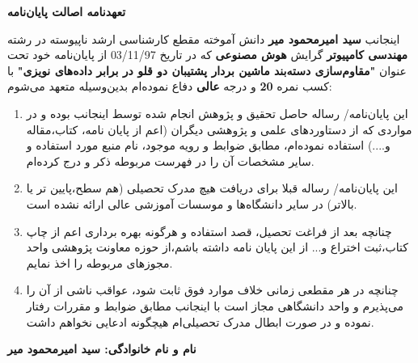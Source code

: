 \thispagestyle{empty}
\noindent

\textbf{\Large تعهدنامه اصالت  پایان‌نامه}
\vskip 1cm

اینجانب \textbf{سید امیرمحمود میر} دانش آموخته مقطع کارشناسی ارشد ناپیوسته در رشته \textbf{مهندسی کامپیوتر} گرایش \textbf{هوش مصنوعی} که در تاریخ 03/11/97 از پایان‌نامه خود تحت عنوان \textbf{"مقاوم‌سازی دسته‌بند ماشین بردار پشتیبان دو قلو در برابر داده‌های نویزی"} با کسب نمره \textbf{20} و درجه \textbf{عالی} دفاع نموده‌ام بدین‌وسیله متعهد می‌شوم:
\begin{enumerate}
	\item این پایان‌نامه/ رساله حاصل تحقیق و پژوهش انجام شده توسط اینجانب بوده و در مواردی که از دستاوردهای علمی و پژوهشی دیگران (اعم از پایان نامه، کتاب،مقاله و....) استفاده نموده‌ام، مطابق ضوابط و رویه موجود، نام منبع مورد استفاده و سایر مشخصات آن را در فهرست مربوطه ذکر و درج کرده‌ام.
	\item این پایان‌نامه/ رساله قبلا برای دریافت هیچ مدرک تحصیلی (هم سطح،پایین تر یا بالاتر) در سایر دانشگاه‌ها و موسسات آموزشی عالی ارائه نشده است.
	\item 	چنانچه بعد از فراغت تحصیل، قصد استفاده و هرگونه بهره برداری اعم از چاپ کتاب،ثبت اختراع و... از این پایان نامه داشته باشم،از حوزه معاونت پژوهشی واحد مجوزهای مربوطه را اخذ نمایم.
	\item 	چنانچه در هر مقطعی زمانی خلاف موارد فوق ثابت شود، عواقب ناشی از آن را می‌پذیرم و واحد دانشگاهی مجاز است با اینجانب مطابق ضوابط و مقررات رفتار نموده و در صورت ابطال مدرک تحصیلی‌ام هیچگونه ادعایی نخواهم داشت.
\end{enumerate}

\vskip 0.5cm
\begin{flushleft}
\textbf{نام و نام خانوادگی: سید امیرمحمود میر}
\end{flushleft}